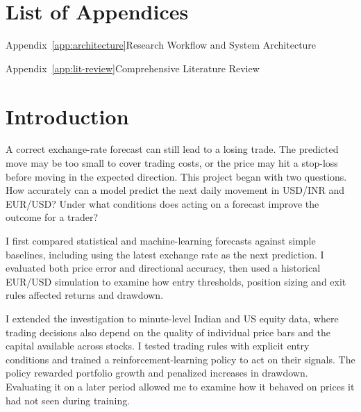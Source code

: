 \documentclass[12pt,a4paper,twoside,openany]{report}
\newcommand{\frontchapter}[1]{\chapter*{#1}\addcontentsline{toc}{chapter}{#1}}
\begin{document}
\renewcommand{\contentsname}{Table of Contents}
\tableofcontents
\clearpage{}\listoffigures
\clearpage{}\listoftables
\clearpage
\frontchapter{List of Appendices}
\noindent Appendix~\ref{app:architecture}\quad Research Workflow and System Architecture\dotfill\pageref{app:architecture}\par
\noindent Appendix~\ref{app:lit-review}\quad Comprehensive Literature Review\dotfill\pageref{app:lit-review}\par
\clearpage{}
\chapter{Introduction}

A correct exchange-rate forecast can still lead to a losing trade. The predicted move may be too small to cover trading costs, or the price may hit a stop-loss before moving in the expected direction. This project began with two questions. How accurately can a model predict the next daily movement in USD/INR and EUR/USD? Under what conditions does acting on a forecast improve the outcome for a trader?

I first compared statistical and machine-learning forecasts against simple baselines, including using the latest exchange rate as the next prediction. I evaluated both price error and directional accuracy, then used a historical EUR/USD simulation to examine how entry thresholds, position sizing and exit rules affected returns and drawdown.

I extended the investigation to minute-level Indian and US equity data, where trading decisions also depend on the quality of individual price bars and the capital available across stocks. I tested trading rules with explicit entry conditions and trained a reinforcement-learning policy to act on their signals. The policy rewarded portfolio growth and penalized increases in drawdown. Evaluating it on a later period allowed me to examine how it behaved on prices it had not seen during training.
\end{document}
